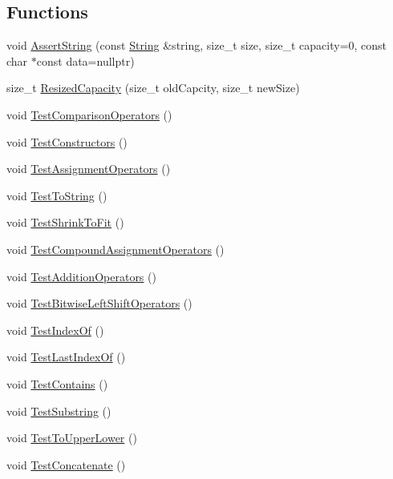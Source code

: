 \subsection*{Functions}
\begin{DoxyCompactItemize}
\item 
void \hyperlink{namespace_power_a518010e2cb8ba2afb94237640eb33bc8}{Assert\+String} (const \hyperlink{class_power_1_1_string}{String} \&string, size\+\_\+t size, size\+\_\+t capacity=0, const char $\ast$const data=nullptr)
\item 
size\+\_\+t \hyperlink{namespace_power_a0ca24021af2fa47b4c93c6a909731bd1}{Resized\+Capacity} (size\+\_\+t old\+Capcity, size\+\_\+t new\+Size)
\item 
void \hyperlink{namespace_power_a93bc9ffcd35542cdc32911f0ab15240f}{Test\+Comparison\+Operators} ()
\item 
void \hyperlink{namespace_power_ac74fec7f3704b9c554276fa307de5bc5}{Test\+Constructors} ()
\item 
void \hyperlink{namespace_power_a1a76f10edba05c095268d242031d5544}{Test\+Assignment\+Operators} ()
\item 
void \hyperlink{namespace_power_a089aad37a74a89e886f605a3ea478664}{Test\+To\+String} ()
\item 
void \hyperlink{namespace_power_ae23123cd183d3656e9fcdb0ca4b54aab}{Test\+Shrink\+To\+Fit} ()
\item 
void \hyperlink{namespace_power_a9980a95021b19e68741111b8d706f60d}{Test\+Compound\+Assignment\+Operators} ()
\item 
void \hyperlink{namespace_power_af5fd85b391b910757cd55c237cfac27a}{Test\+Addition\+Operators} ()
\item 
void \hyperlink{namespace_power_a3d6dfcf89602f4aa5f6c078f41a9a194}{Test\+Bitwise\+Left\+Shift\+Operators} ()
\item 
void \hyperlink{namespace_power_a6dc388a4544e6d59e43eab4625af166f}{Test\+Index\+Of} ()
\item 
void \hyperlink{namespace_power_a11303f4f04e214f86e20de0b5b7c01fa}{Test\+Last\+Index\+Of} ()
\item 
void \hyperlink{namespace_power_a0746abde7fa9ae05b141ec163fb7f9fc}{Test\+Contains} ()
\item 
void \hyperlink{namespace_power_a15f3bf497eb9f54378f0e2b590802bd4}{Test\+Substring} ()
\item 
void \hyperlink{namespace_power_a8fab005f68597905871a451bac70eb1d}{Test\+To\+Upper\+Lower} ()
\item 
void \hyperlink{namespace_power_a97269203badd9375fab60db5f5b11dc5}{Test\+Concatenate} ()

\end{DoxyCompactItemize}

